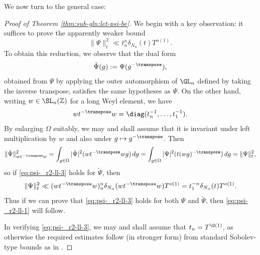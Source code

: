 We now turn to the general case:
\begin{proof}[Proof of Theorem \ref{thm:sub-gln:let-psi-be}]
  We begin with a key observation: it suffices to prove the apparently weaker bound
  \begin{equation}\label{eq:psi-_r2-ll-3}
    \|\Psi \|_t^2 \ll t_n^n \delta_{N_n}(t) T^{o(1)}.
  \end{equation}
  To obtain this reduction, we observe that the dual form
  \begin{equation*}
    \tilde{\Psi}(g) := \Psi(g^{-\transpose}),
  \end{equation*}
  obtained from $\Psi$ by applying the outer automorphism of $\GL_n$ defined by taking the inverse transpose, satisfies the same hypotheses as $\Psi$.  On the other hand, writing $w \in \SL_n(\mathbb{Z})$ for a long Weyl element, we have
  \begin{equation*}
    w t^{-\transpose} w = \diag(t_n^{-1}, \dotsc, t_1^{-1}).
  \end{equation*}
  By enlarging $\Omega$ suitably, we may and shall assume that it is invariant under left multiplication by $w$ and also under $g \mapsto g^{-\transpose}$.  Then
  \begin{equation*}
    \|{\tilde{\Psi}}\|_{w t^{-\transpose} w}^2
    =
    \int_{g \in \Omega }
    |{\tilde{\Psi}}|^2(w t^{-\transpose} w g)
    \, d g
    =
    \int_{g \in \Omega }
    |{\Psi}|^2(t (w g)^{-\transpose})
    \, d g
    =
    \|{\Psi}\|_{t}^2,
  \end{equation*}
  so if \eqref{eq:psi-_r2-ll-3} holds for $\tilde{\Psi}$, then
  \begin{equation*}
    \|\Psi \|_t^2 \ll
    ( w t^{-\transpose} w)_n^n \delta_{N_n}(w t^{-\transpose} w) T^{o(1)}
    =
    t_1^{-n} \delta_{N_n}(t) T^{o(1)}.
  \end{equation*}
  Thus if we can prove that \eqref{eq:psi-_r2-ll-3} holds for both $\Psi$ and $\tilde{\Psi}$, then \eqref{eq:psi-_r2-ll-1} will follow.

  In verifying \eqref{eq:psi-_r2-ll-3}, we may and shall assume that $t_n= T^{\O(1)}$, as otherwise the required estimates follow (in stronger form) from standard Sobolev-type bounds as in \cite[\S2]{michel-2009}.


\end{proof}
